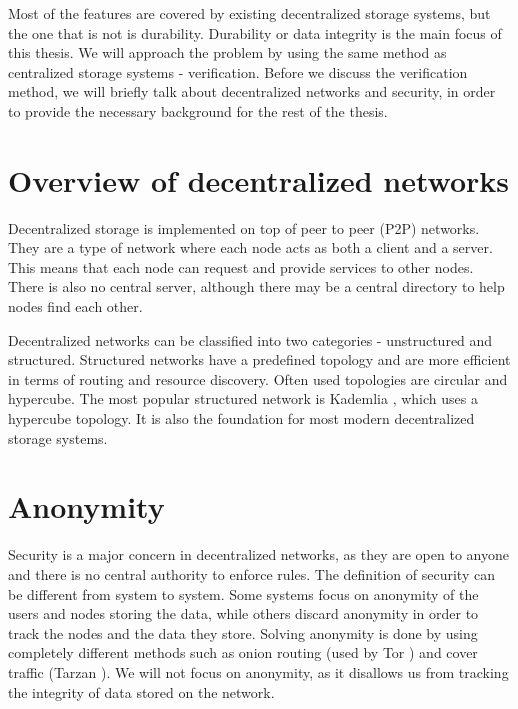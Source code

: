 Most of the features are covered by existing decentralized storage systems, but the one that is not is durability.
Durability or data integrity is the main focus of this thesis.
We will approach the problem by using the same method as centralized storage systems - verification.
Before we discuss the verification method, we will briefly talk about decentralized networks and security,
in order to provide the necessary background for the rest of the thesis.


\section{Overview of decentralized networks}

Decentralized storage is implemented on top of peer to peer (P2P) networks.
They are a type of network where each node acts as both a client and a server.
This means that each node can request and provide services to other nodes.
There is also no central server, although there may be a central directory to help nodes find each other.

Decentralized networks can be classified into two categories - unstructured and structured.
Structured networks have a predefined topology and are more efficient in terms of routing and resource discovery.
Often used topologies are circular and hypercube.
The most popular structured network is Kademlia \cite{kademlia}, which uses a hypercube topology.
It is also the foundation for most modern decentralized storage systems.

\section{Anonymity}

Security is a major concern in decentralized networks,
as they are open to anyone and there is no central authority to enforce rules.
The definition of security can be different from system to system.
Some systems focus on anonymity of the users and nodes storing the data,
while others discard anonymity in order to track the nodes and the data they store.
Solving anonymity is done by using completely different methods such as
onion routing (used by Tor \cite{tor}) and cover traffic (Tarzan \cite{tarzan}).
We will not focus on anonymity, as it disallows us from tracking the integrity of data stored on the network.


